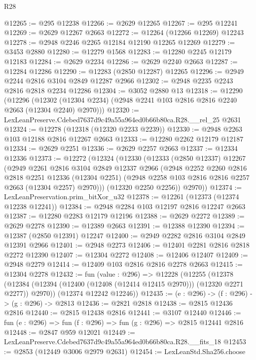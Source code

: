 \begin{lexlean}{R28}
\begin{coremodule}
@12265 := @295 @12238
@12266 := @2629 @12265
@12267 := @295 @12241
@12269 := @2629 @12267 @2663
@12272 := @12264 (@12266 @12269) @12243
@12278 := @2948 @2246 @2265 @12184 @12190 @12265 @12269
@12279 := @3453 @2880
@12280 := @12279 @1568
@12283 := @12280 @2245 @12179 @12183
@12284 := @2629 @2234
@12286 := @2629 @2240 @2663
@12287 := @12284 @12286
@12290 := @12283 (@2850 @12287) @12265
@12296 := @2949 @2244 @2816 @3104 @2849 @12287 @2966
@12302 := @2948 @2235 @2243 @2816 @2818 @2234 @12286
@12304 := @3052 @2880 @13
@12318 := @12290
    (@12296 (@12302 (@12304 @2234) (@2948 @2241 @103 @2816 @2816 @2240 @2663 (@12304 @2240) @2970)))
@12320 := LexLeanPreserve.Cdebed7637d9c49a55a964ed0b66b80ca.R28.__rel_25 @2631
@12324 := @12278 (@12318 (@12320 @2233 @2239))
@12330 := @2948 @2263 @103 @12188 @2816 @12267 @2663
@12333 := @12280 @2262 @12179 @12187
@12334 := @2629 @2251
@12336 := @2629 @2257 @2663
@12337 := @12334 @12336
@12373 := @12272
    (@12324
      (@12330
        (@12333
          (@2850 @12337)
          @12267
          (@2949
            @2261
            @2816
            @3104
            @2849
            @12337
            @2966
            (@2948
              @2252
              @2260
              @2816
              @2818
              @2251
              @12336
              (@12304 @2251)
              (@2948 @2258 @103 @2816 @2816 @2257 @2663 (@12304 @2257) @2970)))
          (@12320 @2250 @2256))
        @2970))
@12374 := LexLeanPreservation.prim_bitXor_u32
@12378 := @12261 (@12373 (@12374 @12238 @12241))
@12384 := @2948 @2284 @103 @12197 @2816 @12247 @2663
@12387 := @12280 @2283 @12179 @12196
@12388 := @2629 @2272
@12389 := @2629 @2278
@12390 := @12389 @2663
@12391 := @12388 @12390
@12394 := @12387 (@2850 @12391) @12247
@12400 := @2949 @2282 @2816 @3104 @2849 @12391 @2966
@12401 := @2948 @2273
@12406 := @12401 @2281 @2816 @2818 @2272 @12390
@12407 := @12304 @2272
@12408 := @12406 @12407
@12409 := @2948 @2279
@12414 := @12409 @103 @2816 @2816 @2278 @2663
@12415 := @12304 @2278
@12432 := fun (value : @296) =>
  @12228
    (@12255
      (@12378 (@12384 (@12394 (@12400 (@12408 (@12414 @12415 @2970))) (@12320 @2271 @2277)) @2970))
      (@12374 @12242 @12246))
@12435 := (e : @296) -> (f : @296) -> (g : @296) -> @2813
@12436 := @2821 @2818
@12438 := @2815 @12436 @2816
@12440 := @2815 @12438 @2816
@12441 := @3107 @12440
@12446 := fun (e : @296) => fun (f : @296) => fun (g : @296) => @2815 @12441 @2816
@12448 := @2847 @959 @12021
@12449 := LexLeanPreserve.Cdebed7637d9c49a55a964ed0b66b80ca.R28.__fits_18
@12453 := @2853 (@12449 @3006 @2979 @2631)
@12454 := LexLeanStd.Sha256.choose

\end{coremodule}
\end{lexlean}
